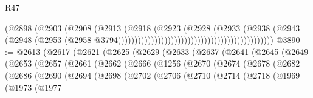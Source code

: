 \begin{lexlean}{R47}
\begin{coremodule}
                                                                        (@2898
                                                                          (@2903
                                                                            (@2908
                                                                              (@2913
                                                                                (@2918
                                                                                  (@2923
                                                                                    (@2928
                                                                                      (@2933
                                                                                        (@2938
                                                                                          (@2943
                                                                                            (@2948
                                                                                              (@2953
                                                                                                (@2958
                                                                                                  @3794)))))))))))))))))))))))))))))))))))))))))))))))
@3890 := @2613
    (@2617
      (@2621
        (@2625
          (@2629
            (@2633
              (@2637
                (@2641
                  (@2645
                    (@2649
                      (@2653
                        (@2657
                          (@2661
                            (@2662
                              (@2666
                                (@1256
                                  (@2670
                                    (@2674
                                      (@2678
                                        (@2682
                                          (@2686
                                            (@2690
                                              (@2694
                                                (@2698
                                                  (@2702
                                                    (@2706
                                                      (@2710
                                                        (@2714
                                                          (@2718
                                                            (@1969
                                                              (@1973
                                                                (@1977

\end{coremodule}
\end{lexlean}
